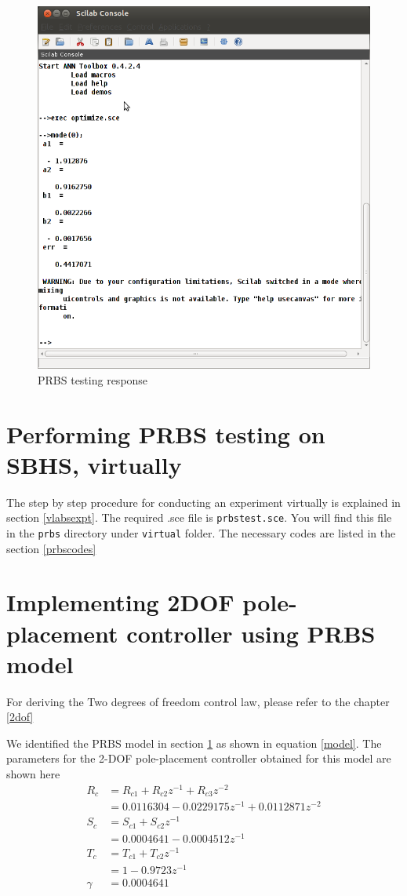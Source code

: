 \begin{figure}
\centering
\includegraphics[width=0.7\linewidth]{prbs/prbs-model.png}
\caption{PRBS testing response}
\label{prbs-model}
\end{figure}



\section{Performing PRBS testing on SBHS, virtually}
The step by step procedure for conducting an experiment virtually is explained in section \ref{vlabsexpt}. The required .sce file is {\tt prbstest.sce}.  You will find this file in the {\tt prbs} directory under {\tt virtual} folder. The necessary codes are listed in the section \ref{prbscodes}

\section{Implementing 2DOF pole-placement controller using PRBS model}

For deriving the Two degrees of freedom control law, please refer to the chapter \ref{2dof}

We identified the PRBS model in section \ref{prbs-model} as shown in equation \ref{model}. The parameters for the 2-DOF pole-placement controller obtained for this model are shown here
\begin{align*}
R_c&=R_{c1}+R_{c2}z^{-1}+R_{c3}z^{-2}\\
&=0.0116304-0.0229175z^{-1}+0.0112871z^{-2}\\
S_c&=S_{c1}+S_{c2}z^{-1}\\
&=0.0004641-0.0004512z^{-1}\\
T_c&=T_{c1}+T_{c2}z^{-1}\\
&=1-0.9723z^{-1}\\
\gamma&=0.0004641
\end{align*}

